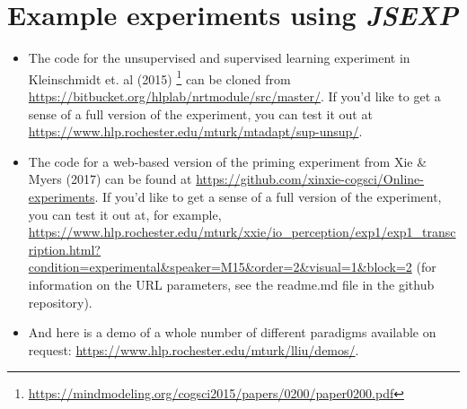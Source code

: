 \documentclass{article}
\begin{document}
\section{Example experiments using {\em JSEXP}}

\begin{itemize}
    \item The code for the unsupervised and supervised learning experiment in Kleinschmidt et. al (2015) \footnote{\href{https://mindmodeling.org/cogsci2015/papers/0200/paper0200.pdf}{https://mindmodeling.org/cogsci2015/papers/0200/paper0200.pdf}} can be cloned from \url{https://bitbucket.org/hlplab/nrtmodule/src/master/}. If you'd like to get a sense of a full version of the experiment, you can test it out at \url{https://www.hlp.rochester.edu/mturk/mtadapt/sup-unsup/}.
    \item The code for a web-based version of the priming experiment from Xie \& Myers (2017) can be found at \url{https://github.com/xinxie-cogsci/Online-experiments}. If you'd like to get a sense of a full version of the experiment, you can test it out at, for example, \url{https://www.hlp.rochester.edu/mturk/xxie/io_perception/exp1/exp1_transcription.html?condition=experimental&speaker=M15&order=2&visual=1&block=2} (for information on the URL parameters, see the readme.md file in the github repository).
    \item And here is a demo of a whole number of different paradigms available on request: \url{https://www.hlp.rochester.edu/mturk/lliu/demos/}.
\end{itemize}
\end{document}
